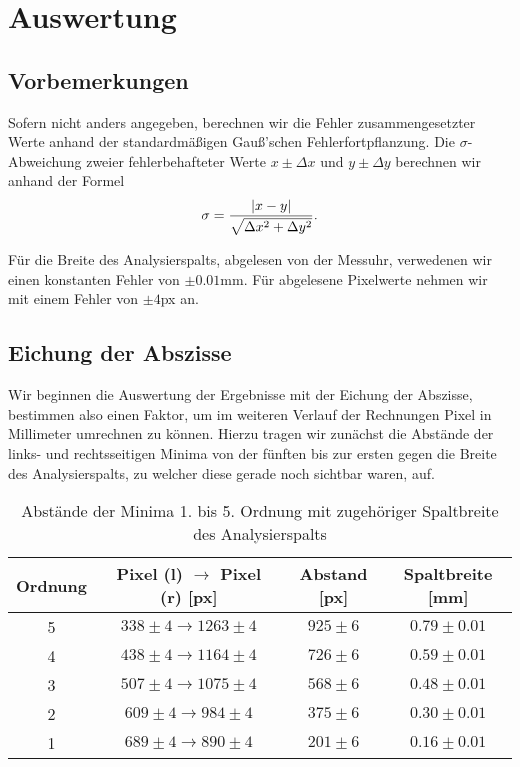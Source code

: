 \section{Auswertung}

\subsection*{Vorbemerkungen}

Sofern nicht anders angegeben, berechnen wir die Fehler zusammengesetzter Werte anhand der standardmäßigen Gauß'schen Fehlerfortpflanzung. Die $\sigma$-Abweichung zweier fehlerbehafteter Werte $x \pm \Delta x$ und $y \pm \Delta y$ berechnen wir anhand der Formel
\begin{align}
  \sigma = \frac{\qty|x - y|}{\sqrt{\Delta x^2 + \Delta y^2}}.
\end{align}

Für die Breite des Analysierspalts, abgelesen von der Messuhr, verwedenen wir einen konstanten Fehler von $\pm0.01\si{\milli\meter}$. Für abgelesene Pixelwerte nehmen wir mit einem Fehler von $\pm 4$px an.

\subsection{Eichung der Abszisse}

Wir beginnen die Auswertung der Ergebnisse mit der Eichung der Abszisse, bestimmen also einen Faktor, um im weiteren Verlauf der Rechnungen Pixel in Millimeter umrechnen zu können. Hierzu tragen wir zunächst die Abstände der links- und rechtsseitigen Minima von der fünften bis zur ersten gegen die Breite des Analysierspalts, zu welcher diese gerade noch sichtbar waren, auf.

\begin{table}[H]
  \centering
  \caption{Abstände der Minima 1. bis 5. Ordnung mit zugehöriger Spaltbreite des Analysierspalts}
  \vspace*{0.5em}
  \begin{tabular}{c|c|c|c}
    Ordnung & Pixel (l) $\to$ Pixel (r) [px] & Abstand [px] & Spaltbreite [mm]\\\hline
    5 & $338 \pm 4 \to 1263 \pm 4$ & $925 \pm 6$ & $0.79 \pm 0.01$\\
    4 & $438 \pm 4 \to 1164 \pm 4$ & $726 \pm 6$  & $0.59 \pm 0.01$\\
    3 & $507 \pm 4 \to 1075 \pm 4$ & $568 \pm 6$ & $0.48 \pm 0.01$\\
    2 & $609 \pm 4 \to 984 \pm 4$ & $375 \pm 6$ & $0.30 \pm 0.01$\\
    1 & $689 \pm 4 \to 890 \pm 4$ & $201 \pm 6$ & $0.16 \pm 0.01$
  \end{tabular}
\end{table}

